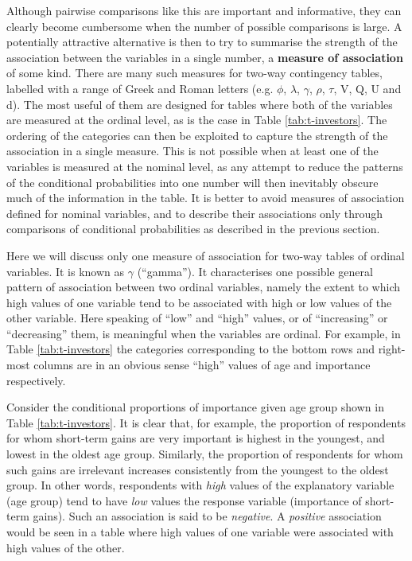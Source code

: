 \documentclass[11pt,a4paper,openany]{book}
\begin{document}
Although pairwise comparisons like this are important and informative,
they can clearly become cumbersome when the number of possible
comparisons is large. A potentially attractive alternative is then to
try to summarise the strength of the association between the variables
in a single number, a \textbf{measure of association} of some kind.
There are many such measures for two-way contingency tables, labelled
with a range of Greek and Roman letters (e.g. \(\phi\), \(\lambda\),
\(\gamma\), \(\rho\), \(\tau\), V, Q, U and d). The most useful of them
are designed for tables where both of the variables are measured at the
ordinal level, as is the case in Table \ref{tab:t-investors}. The
ordering of the categories can then be exploited to capture the strength
of the association in a single measure. This is not possible when at
least one of the variables is measured at the nominal level, as any
attempt to reduce the patterns of the conditional probabilities into one
number will then inevitably obscure much of the information in the
table. It is better to avoid measures of association defined for nominal
variables, and to describe their associations only through comparisons
of conditional probabilities as described in the previous section.

Here we will discuss only one measure of association for two-way tables
of ordinal variables. It is known as \(\gamma\) (``gamma''). It
characterises one possible general pattern of association between two
ordinal variables, namely the extent to which high values of one
variable tend to be associated with high or low values of the other
variable. Here speaking of ``low'' and ``high'' values, or of
``increasing'' or ``decreasing'' them, is meaningful when the variables
are ordinal. For example, in Table \ref{tab:t-investors} the categories
corresponding to the bottom rows and right-most columns are in an
obvious sense ``high'' values of age and importance respectively.

Consider the conditional proportions of importance given age group shown
in Table \ref{tab:t-investors}. It is clear that, for example, the
proportion of respondents for whom short-term gains are very important
is highest in the youngest, and lowest in the oldest age group.
Similarly, the proportion of respondents for whom such gains are
irrelevant increases consistently from the youngest to the oldest group.
In other words, respondents with \emph{high} values of the explanatory
variable (age group) tend to have \emph{low} values the response
variable (importance of short-term gains). Such an association is said
to be \emph{negative}. A \emph{positive} association would be seen in a
table where high values of one variable were associated with high values
of the other.
\end{document}
